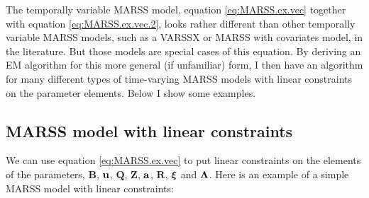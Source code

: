 \documentclass[]{article}
\def\xixi{\mbox{\boldmath $\xi$}}
\def\LAM{\mbox{\boldmath $\Lambda$}}
\def\ZZ{\mbox{$\mathbf Z$}}	\def\zz{\mbox{$\mathbf z$}}
\def\BB{\mbox{$\mathbf B$}}	\def\bb{\mbox{$\mathbf b$}}
\def\QQ{\mbox{$\mathbf Q$}}	 \def\qq{\mbox{$\mathbf q$}}
\def\RR{\mbox{$\mathbf R$}}	 \def\rr{\mbox{$\mathbf r$}}
\begin{document}
The temporally variable MARSS model, equation \ref{eq:MARSS.ex.vec} together with equation \ref{eq:MARSS.ex.vec.2}, looks rather different than other temporally variable MARSS models, such as a VARSSX or MARSS with covariates model, in the literature.  But those models are special cases of this equation.  By deriving an EM algorithm for this more general (if unfamiliar) form, I then have an algorithm for many different types of time-varying MARSS models with linear constraints on the parameter elements.  Below I show some examples. 

\subsection{MARSS model with linear constraints}
We can use equation \ref{eq:MARSS.ex.vec} to put linear constraints on the elements of the parameters, $\BB$, $\uu$, $\QQ$, $\ZZ$, $\aa$, $\RR$, $\xixi$ and $\LAM$. Here is an example of a simple MARSS model with linear constraints:
\end{document}
